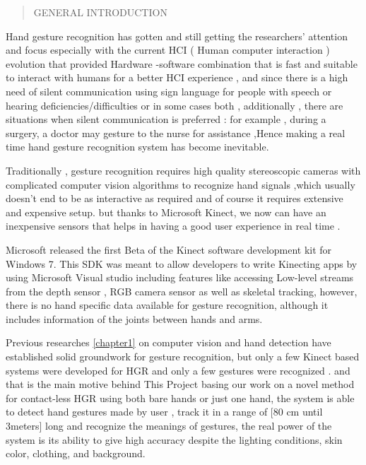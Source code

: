 \begin{quote}
 
\centering

    {
\huge 

GENERAL  INTRODUCTION 

}
\end{quote}


\vspace{1.5cm}

Hand gesture recognition  has gotten and still getting the researchers' attention and focus especially with the current HCI ( Human computer interaction ) evolution that provided Hardware -software  combination that is fast and suitable to interact with humans for a better HCI experience , and since there is a high need of silent communication using sign language for people with speech or  hearing  deficiencies/difficulties or in some cases both , additionally , there are situations when silent communication is preferred : for example , during a surgery,  a doctor may gesture to the nurse for assistance ,Hence making a real time  hand gesture recognition system has become inevitable.

Traditionally , gesture recognition requires high quality stereoscopic cameras with complicated computer vision algorithms to recognize hand signals ,which usually doesn't end to be as interactive as required and of course it requires extensive and expensive setup. but thanks to Microsoft  Kinect, we now can have  an inexpensive  sensors  that helps in having a good user experience in real time .

Microsoft released the first Beta of the Kinect software development kit for Windows 7. This SDK was meant to allow developers to write Kinecting apps by using Microsoft Visual studio including features like accessing Low-level streams from the depth sensor , RGB camera sensor   as well as skeletal  tracking, however,  there  is no hand  specific  data  available for  gesture   recognition,   although    it   includes   information  of the  joints   between  hands   and  arms.

Previous   researches  \ref{chapter1}  on  computer   vision  and hand   detection   have established   solid  groundwork    for gesture   recognition, but  only  a  few  Kinect based   systems  were  developed   for  HGR    and  only  a  few  gestures were recognized . and that is  the main motive behind This Project basing our work on a novel method for contact-less HGR using both bare hands or just  one hand, the system is able to detect hand gestures  made by user , track it  in a range of [80 cm until 3meters] long  and  recognize the meanings of gestures, the real power of the system is its ability to give high accuracy  despite the lighting  conditions,   skin color, clothing,  and background.

